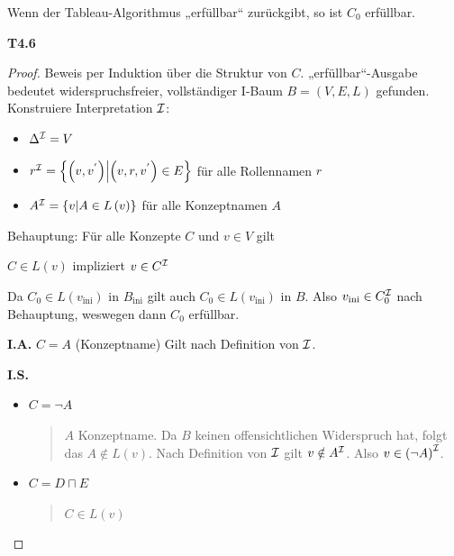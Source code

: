 \begin{proposition}

Wenn der Tableau-Algorithmus „erfüllbar`` zurückgibt, so ist $C_{0}$
erfüllbar.
\end{proposition}

\textbf{T4.6}

\begin{proof}

Beweis per Induktion über die Struktur von $C$.
„erfüllbar``-Ausgabe bedeutet widerspruchsfreier, vollständiger I-Baum
$B = \left( V,E,L \right)$ gefunden. Konstruiere Interpretation $\mathcal{I}$:

\begin{itemize}
\item
  $\Delta^{\mathcal{I}} = V$
\item
  $r^{\mathcal{I}} = \left\{ \left( v,v^{'} \right) \middle| \left( v,r,v^{'} \right) \in E \right\}$
  für alle Rollennamen $r$
\item
  $A^{\mathcal{I}} = \left\{ v \middle| A \in L\left( v \right) \right\}$ für
  alle Konzeptnamen $A$
\end{itemize}

Behauptung: Für alle Konzepte $C$ und $v \in V$ gilt

\begin{center}$C \in L\left( v \right)$ impliziert $v \in C^{\mathcal{I}}$\end{center}

Da $C_{0} \in L\left( v_{\text{ini}} \right)$ in $B_{\text{ini}}$ gilt
auch $C_{0} \in L\left( v_{\text{ini}} \right)$ in $B$. Also
$v_{\text{ini}} \in C_{0}^{\mathcal{I}}$ nach Behauptung, weswegen dann
$C_{0}$ erfüllbar.

\textbf{I.A.} $C = A$ (Konzeptname) Gilt nach Definition von
$\mathcal{I}$.

\textbf{I.S.}

\begin{itemize}
\item
  $C = \neg A$

\begin{quote}
$A$ Konzeptname. Da $B$ keinen offensichtlichen Widerspruch hat,
folgt das $A \notin L(v)$. Nach Definition von $\mathcal{I}$ gilt
$v \notin A^{\mathcal{I}}$. Also $v \in \left( \neg A \right)^{\mathcal{I}}$.
\end{quote}

\item
  $C = D \sqcap E$

\begin{quote}
$C \in L\left( v \right)$ 


\end{quote}
\end{itemize}
\end{proof}

